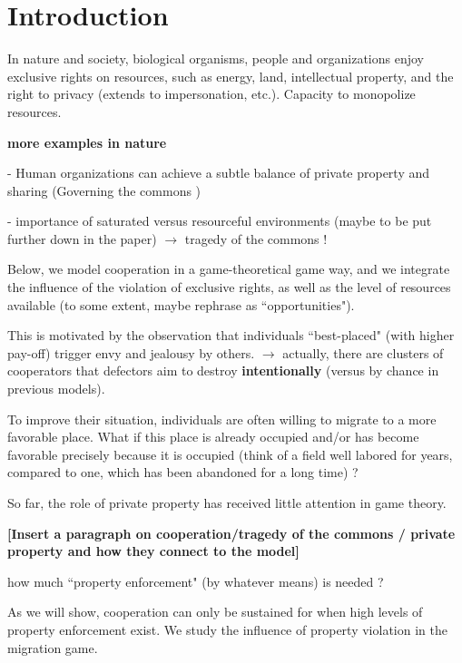 \section*{Introduction}
In nature and society, biological organisms, people and organizations enjoy exclusive rights on resources, such as energy, land, intellectual property, and the right to privacy (extends to impersonation, etc.). Capacity to monopolize resources.

{\bf more examples in nature}


- Human organizations can achieve a subtle balance of private property and sharing (Governing the commons \cite{ostrom})

- importance of saturated versus resourceful environments (maybe to be put further down in the paper) $\rightarrow$ tragedy of the commons !

Below, we model cooperation in a game-theoretical game  way,  and we integrate the influence of the violation of exclusive rights, as well as the level of resources available (to some extent, maybe rephrase as ``opportunities").

This is motivated by the observation that individuals ``best-placed" (with higher pay-off) trigger envy and jealousy by others. $\rightarrow$ actually, there are clusters of cooperators that defectors aim to destroy {\bf intentionally} (versus by chance in previous models).

To improve their situation, individuals are often willing to migrate to a more favorable place. What if this place is already occupied and/or has become favorable precisely because it is occupied (think of a field well labored for years, compared to one, which has been abandoned for a long time) ?

So far, the role of private property has received little attention in game theory.

{\bf [Insert a paragraph on cooperation/tragedy of the commons / private property and how they connect to the model]}

how much ``property enforcement" (by whatever means) is needed ? 

As we will show, cooperation can only be sustained for when high levels of property enforcement exist. We study the influence of property violation in the migration game.
